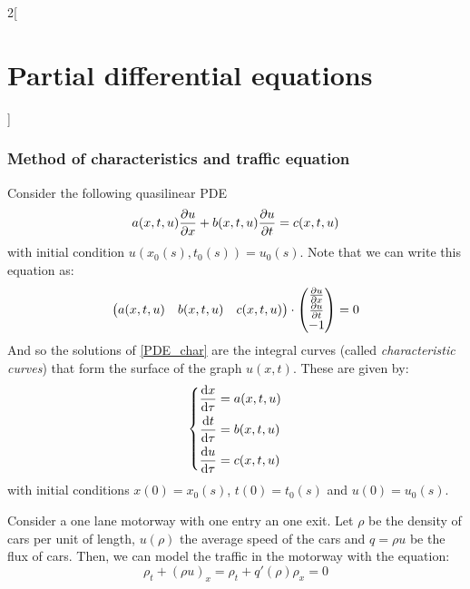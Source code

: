 \documentclass[../../../main.tex]{subfiles}
\begin{document}
\begin{multicols}{2}[\section{Partial differential equations}]
  \subsubsection{Method of characteristics and traffic equation}
  \begin{proposition}
    Consider the following quasilinear PDE
    \begin{equation}\label{PDE_char}
      a(x,t,u)\pdv{u}{x}+b(x,t,u)\pdv{u}{t}=c(x,t,u)
    \end{equation}
    with initial condition $u(x_0(s),t_0(s))=u_0(s)$.
    Note that we can write this equation as: $$\begin{pmatrix}
        a(x,t,u) & b(x,t,u) & c(x,t,u)
      \end{pmatrix}\cdot\begin{pmatrix}
        \pdv{u}{x} \\
        \pdv{u}{t} \\
        -1
      \end{pmatrix}=0$$
    And so the solutions of \cref{PDE_char} are the integral curves (called \emph{characteristic curves}) that form the surface of the graph $u(x,t)$. These are given by:
    \begin{equation*}
      \left\{
      \begin{aligned}
        \dv{x}{\tau} & = a(x,t,u) \\
        \dv{t}{\tau} & = b(x,t,u) \\
        \dv{u}{\tau} & = c(x,t,u) \\
      \end{aligned}
      \right.
    \end{equation*}
    with initial conditions $x(0)=x_0(s)$, $t(0)=t_0(s)$ and $u(0)=u_0(s)$.
  \end{proposition}
  \begin{proposition}
    Consider a one lane motorway with one entry an one exit. Let $\rho$ be the density of cars per unit of length, $u(\rho)$ the average speed of the cars and $q=\rho u$ be the flux of cars. Then, we can model the traffic in the motorway with the equation: $$\rho_t+{(\rho u)}_x=\rho_t+q'(\rho){\rho}_x=0$$
  \end{proposition}
\end{multicols}
\end{document}
